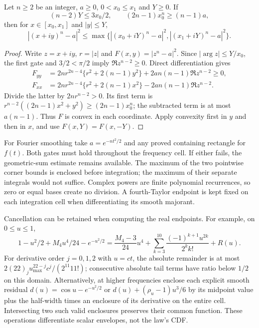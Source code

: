 \begin{lemma}
\label{ext:two-corners}
Let $n\ge2$ be an integer, $a\ge0$, $0<x_0\le x_1$ and $Y\ge0$.
If
\[
 (n-2)Y\le3x_0/2,\qquad (2n-1)x_0^n\ge(n-1)a,
\]
then for $x\in[x_0,x_1]$ and $|y|\le Y$,
\[
 |(x+iy)^n-a|^2
 \le\max\{|(x_0+iY)^n-a|^2,|(x_1+iY)^n-a|^2\}.
\]
\end{lemma}
\begin{proof}
Write $z=x+iy$, $r=|z|$ and $F(x,y)=|z^n-a|^2$.
Since $|\arg z|\le Y/x_0$, the first gate and $3/2<\pi/2$ imply
$\Re z^{n-2}\ge0$. Direct differentiation gives
\begin{align*}
 F_{yy}&=2nr^{2n-4}\{r^2+2(n-1)y^2\}
                         +2an(n-1)\Re z^{n-2}\ge0,\\
 F_{xx}&=2nr^{2n-4}\{r^2+2(n-1)x^2\}
                         -2an(n-1)\Re z^{n-2}.
\end{align*}
Divide the latter by $2nr^{n-2}>0$. Its first term is
$r^{n-2}((2n-1)x^2+y^2)\ge(2n-1)x_0^n$; the subtracted
term is at most $a(n-1)$. Thus $F$ is convex in each coordinate.
Apply convexity first in $y$ and then in $x$, and use
$F(x,Y)=F(x,-Y)$.
\end{proof}

For Fourier smoothing take $a=e^{-nt^2/2}$ and any proved containing
rectangle for $f(t)$. Both gates must hold throughout the frequency
cell. If either fails, the geometric-sum estimate remains available.
The maximum of the two pointwise corner bounds is enclosed before
integration; the maximum of their separate integrals would not suffice.
Complex powers are finite polynomial recurrences, so zero or equal
bases create no division. A fourth-Taylor endpoint is kept fixed on
each integration cell when differentiating its smooth majorant.

Cancellation can be retained when computing the real endpoints.
For example, on $0\le u\le1$,
\[
 1-u^2/2+M_4u^4/24-e^{-u^2/2}
 =\frac{M_4-3}{24}u^4
   +\sum_{k=3}^{10}\frac{(-1)^{k+1}u^{2k}}{2^kk!}+R(u).
\]
For derivative order $j=0,1,2$ with $u=ct$, the absolute remainder
is at most $2(22)_j u_{\max}^{22-j}c^j/(2^{11}11!)$; consecutive
absolute tail terms have ratio below $1/2$ on this domain.
Alternatively, at higher frequencies enclose each explicit smooth
residual $d(u)=\cos u-e^{-u^2/2}$ or
$d(u)+(\rho_u-1)u^3/6$ by its midpoint value plus the half-width
times an enclosure of its derivative on the entire cell.
Intersecting two such valid enclosures preserves their common function.
These operations differentiate scalar envelopes, not the law's CDF.

